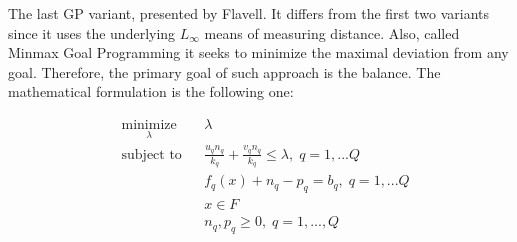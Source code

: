 \begin{doublespace}
The last GP variant, presented by Flavell\cite{Flavell1976}. It differs from the first two variants since it uses the underlying $ L_\infty $ means of measuring distance. Also, called Minmax Goal Programming it seeks to minimize the maximal deviation from any goal. Therefore, the primary goal of such approach is the balance. The mathematical formulation is the following one:

\begin{equation*}
\begin{aligned}
& \underset{\lambda}{\text{minimize}}
& & \lambda \\
& \text{subject to}
& & \frac{u_q n_q}{k_q}+\frac{v_q n_q}{k_q}\leq\lambda, \; q=1,...Q \\
& & & f_q(x)+n_q-p_q=b_q, \; q=1,...Q \\
& & & x\in F \\
& & & n_q,p_q\geq 0, \; q=1,...,Q 
\end{aligned}
\end{equation*}

\end{doublespace}
\clearpage{\pagestyle{empty}\cleardoublepage}
